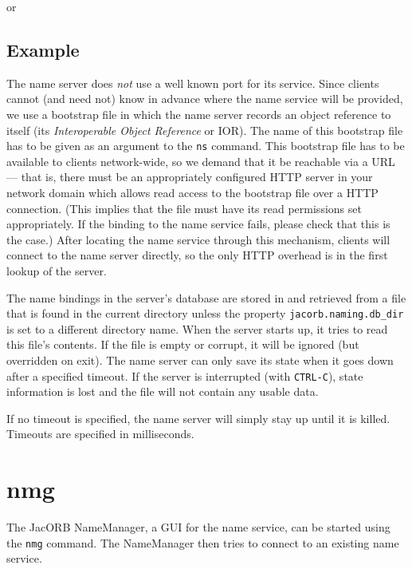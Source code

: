 
or


\subsection*{Example}


The name server does {\it not}  use a well known port for its service.
Since clients  cannot (and  need not) know  in advance where  the name
service will  be provided, we use  a bootstrap file in  which the name
server records  an object reference to itself  (its {\it Interoperable
Object Reference} or  IOR). The name of this bootstrap  file has to be
given as an argument to the  {\tt ns} command. This bootstrap file has
to  be available  to clients  network-wide, so  we demand  that  it be
reachable  via a  URL  --- that  is,  there must  be an  appropriately
configured HTTP server in your network domain which allows read access
to the bootstrap  file over a HTTP connection.  (This implies that the
file must have its read  permissions set appropriately. If the binding
to the name service fails, please  check that this is the case.) After
locating the name service through this mechanism, clients will connect
to the name server directly, so the only HTTP overhead is in the first
lookup of the server.

The name bindings in the server's database are stored in and retrieved
from a file that is found in the current directory unless the property
{\tt jacorb.naming.db\_dir} is set to a different directory name. When
the server  starts up, it tries  to read this file's  contents. If the
file  is  empty or  corrupt,  it will  be  ignored  (but overridden  on
exit). The name server can only save its state when it goes down after
a specified timeout. If the server is interrupted (with {\tt CTRL-C}),
state information  is lost  and the file  will not contain  any usable
data.

If no timeout is specified, the name server will simply stay up until
it is killed. Timeouts are specified in milliseconds.

\section{nmg}

The JacORB  NameManager, a  GUI for the  name service, can  be started
using the {\tt nmg} command.  The NameManager then tries to connect to
an existing name service.

